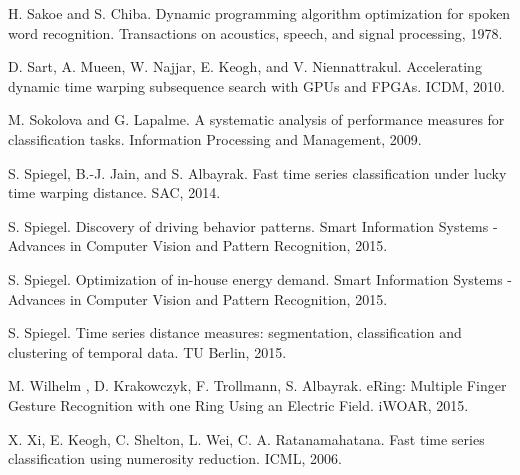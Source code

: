 \begin{thebibliography}{11}
    H. Sakoe and S. Chiba.
    Dynamic programming algorithm optimization for spoken word recognition.
    Transactions on acoustics, speech, and signal processing, 1978.

    D. Sart, A. Mueen, W. Najjar, E. Keogh, and V. Niennattrakul.
	Accelerating dynamic time warping subsequence search with GPUs and FPGAs.
	ICDM, 2010.

    M. Sokolova and G. Lapalme.
    A systematic analysis of performance measures for classification tasks.
    Information Processing and Management, 2009.

	S. Spiegel, B.-J. Jain, and S. Albayrak.
	Fast time series classification under lucky time warping distance.
	SAC, 2014.

	S. Spiegel.
	Discovery of driving behavior patterns.
	Smart Information Systems - Advances in Computer Vision and Pattern Recognition, 2015.

	S. Spiegel.
	Optimization of in-house energy demand.
	Smart Information Systems - Advances in Computer Vision and Pattern Recognition, 2015.

	 S. Spiegel.
	Time series distance measures: segmentation, classification and clustering of temporal data.
	TU Berlin, 2015.

	M. Wilhelm , D. Krakowczyk, F. Trollmann, S. Albayrak.
	eRing: Multiple Finger Gesture Recognition with one Ring Using an Electric Field.
	iWOAR, 2015.

	X. Xi, E. Keogh, C. Shelton, L. Wei, C. A. Ratanamahatana.
	Fast time series classification using numerosity reduction.
	ICML, 2006.

\end{thebibliography}
